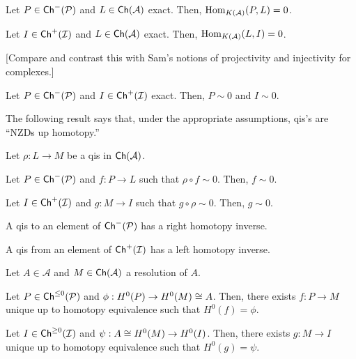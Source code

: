\documentclass[11pt]{article}
\renewcommand{\A}{\mathcal{A}}
\newcommand{\I}{\mathcal{I}}
\renewcommand{\P}{\mathcal{P}}
\begin{document}
\begin{lemma}[A, Cor 5.12]
\hfill
\begin{enum}{\alph}
\item Let $P\in\Ch^-(\P)$ and $L\in\Ch(\A)$ exact. Then, $\Hom_{K(\A)}(P,L)=0$.

\item Let $I\in\Ch^+(\I)$ and $L\in\Ch(\A)$ exact. Then, $\Hom_{K(\A)}(L,I)=0$.
\end{enum}
\end{lemma}

[Compare and contrast this with Sam's notions of projectivity and injectivity for complexes.]

\begin{lemma}[A, Cor 5.13]
Let $P\in\Ch^-(\P)$ and $I\in\Ch^+(\I)$ exact. Then, $P\sim0$ and $I\sim0$.
\end{lemma}

The following result says that, under the appropriate assumptions, qis's are ``NZDs up homotopy.''

\begin{lemma}[A, Lemma 5.14]
Let $\rho: L\to M$ be a qis in $\Ch(\A)$.
\begin{enum}{\alph}
\item Let $P\in\Ch^-(\P)$ and $f: P\to L$ such that $\rho\circ f\sim0$. Then, $f\sim0$.

\item Let $I\in\Ch^+(\I)$ and $g: M\to I$ such that $g\circ\rho\sim0$. Then, $g\sim0$.
\end{enum}
\end{lemma}

\begin{proposition}[A, Prop 5.15]
\hfill
\begin{enum}{\alph}
\item A qis to an element of $\Ch^-(\P)$ has a right homotopy inverse.
\item A qis from an element of $\Ch^+(\I)$ has a left homotopy inverse.
\end{enum}
\end{proposition}

\begin{lemma}[A, Lemma 6.3]
Let $A\in\A$ and $M\in\Ch(\A)$ a resolution of $A$.
\begin{enum}{\alph}
\item Let $P\in\Ch^{\leq0}(\P)$ and $\phi: H^0(P)\to H^0(M)\cong A$. Then, there exists $f: P\to M$ unique up to homotopy equivalence such that $H^0(f)=\phi$.

\item Let $I\in\Ch^{\geq0}(\I)$ and $\psi: A\cong H^0(M)\to H^0(I)$. Then, there exists $g: M\to I$ unique up to homotopy equivalence such that $H^0(g)=\psi$.
\end{enum}
\end{lemma}
\end{document}
